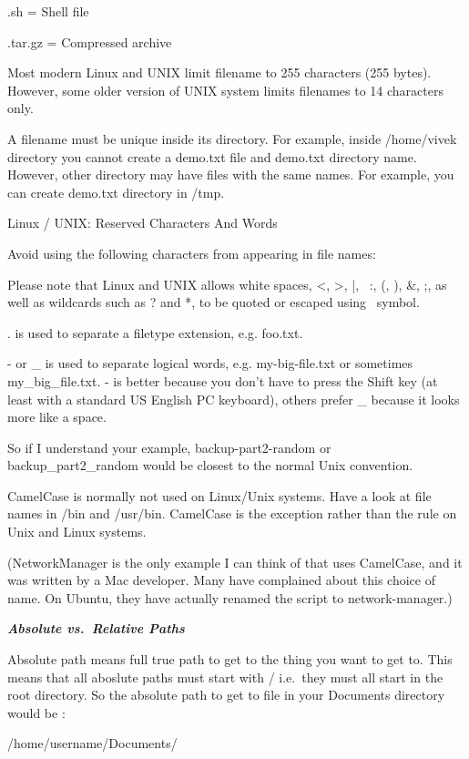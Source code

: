 .sh = Shell file

.tar.gz = Compressed archive

Most modern Linux and UNIX limit filename to 255 characters (255 bytes).
However, some older version of UNIX system limits filenames to 14 characters
only.

A filename must be unique inside its directory. For example, inside /home/vivek
directory you cannot create a demo.txt file and demo.txt directory name.
However, other directory may have files with the same names. For example, you
can create demo.txt directory in /tmp.

Linux / UNIX: Reserved Characters And Words

Avoid using the following characters from appearing in file names:


Please note that Linux and UNIX allows white spaces, <, >, |, \, :, (, ), \&, ;,
as well as wildcards such as ? and *, to be quoted or escaped using \ symbol. 

. is used to separate a filetype extension, e.g. foo.txt.

- or \_ is used to separate logical words, e.g. my-big-file.txt or sometimes
my\_big\_file.txt. - is better because you don't have to press the Shift key (at
least with a standard US English PC keyboard), others prefer \_ because it looks
more like a space.

So if I understand your example, backup-part2-random or backup\_part2\_random
would be closest to the normal Unix convention.

CamelCase is normally not used on Linux/Unix systems. Have a look at file names
in /bin and /usr/bin. CamelCase is the exception rather than the rule on Unix
and Linux systems.

(NetworkManager is the only example I can think of that uses CamelCase, and it
was written by a Mac developer. Many have complained about this choice of name.
On Ubuntu, they have actually renamed the script to network-manager.)


\textbf{\textit{Absolute vs.\ Relative Paths}}


Absolute path means full true path to get to the thing you want to get to. This
means that all aboslute paths must start with / i.e.\ they must all start in the
root directory. So the absolute path to get to file in your Documents directory
would be :

/home/username/Documents/

